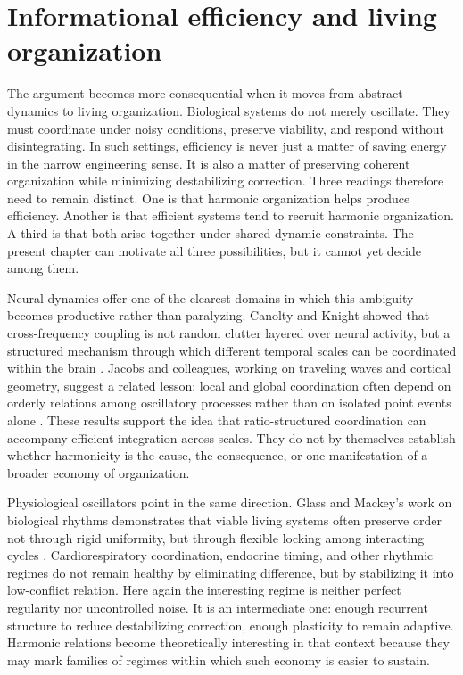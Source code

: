 \section{Informational efficiency and living organization}

The argument becomes more consequential when it moves from abstract dynamics to living organization. Biological systems do not merely oscillate. They must coordinate under noisy conditions, preserve viability, and respond without disintegrating. In such settings, efficiency is never just a matter of saving energy in the narrow engineering sense. It is also a matter of preserving coherent organization while minimizing destabilizing correction. Three readings therefore need to remain distinct. One is that harmonic organization helps produce efficiency. Another is that efficient systems tend to recruit harmonic organization. A third is that both arise together under shared dynamic constraints. The present chapter can motivate all three possibilities, but it cannot yet decide among them.

Neural dynamics offer one of the clearest domains in which this ambiguity becomes productive rather than paralyzing. Canolty and Knight showed that cross-frequency coupling is not random clutter layered over neural activity, but a structured mechanism through which different temporal scales can be coordinated within the brain \parencite{canolty_2010}. Jacobs and colleagues, working on traveling waves and cortical geometry, suggest a related lesson: local and global coordination often depend on orderly relations among oscillatory processes rather than on isolated point events alone \parencite{jacobs_2025}. These results support the idea that ratio-structured coordination can accompany efficient integration across scales. They do not by themselves establish whether harmonicity is the cause, the consequence, or one manifestation of a broader economy of organization.

Physiological oscillators point in the same direction. Glass and Mackey's work on biological rhythms demonstrates that viable living systems often preserve order not through rigid uniformity, but through flexible locking among interacting cycles \parencite{glass_1988}. Cardiorespiratory coordination, endocrine timing, and other rhythmic regimes do not remain healthy by eliminating difference, but by stabilizing it into low-conflict relation. Here again the interesting regime is neither perfect regularity nor uncontrolled noise. It is an intermediate one: enough recurrent structure to reduce destabilizing correction, enough plasticity to remain adaptive. Harmonic relations become theoretically interesting in that context because they may mark families of regimes within which such economy is easier to sustain.

